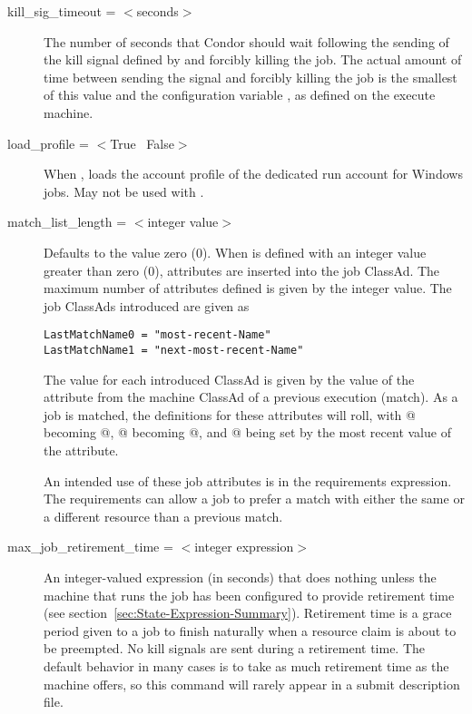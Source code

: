 \begin{description}

\item[kill\_sig\_timeout = $<$seconds$>$] The number of seconds that Condor
should wait following the sending of the kill signal defined by
 and forcibly killing the job.
The actual amount of time between sending the signal and forcibly killing
the job is the smallest of this value and the configuration variable
, as defined on the execute machine.


\item[load\_profile = $<$True \Bar\ False$>$]
When , loads the account profile of the dedicated run account for
Windows jobs.
May not be used with .


\item[match\_list\_length = $<$integer value$>$]
Defaults to the value zero (0).
When  is defined with an integer value
greater than zero (0),
attributes are inserted into the job ClassAd.
The maximum number of attributes defined is given by the integer
value.
The job ClassAds introduced are given as
\begin{verbatim}
LastMatchName0 = "most-recent-Name"
LastMatchName1 = "next-most-recent-Name"
\end{verbatim}

The value for each introduced ClassAd is given by the
value of the  attribute
from the machine ClassAd of a previous execution (match).
As a job is matched, the definitions for these attributes
will roll,
with @ becoming @,
@ becoming @,
and @ being set by the most recent
value of the  attribute.

An intended use of
these job attributes is in the requirements expression.
The requirements can allow a job to prefer a match with either the same
or a different resource than a previous match.



\item[max\_job\_retirement\_time = $<$integer expression$>$]
An integer-valued expression (in seconds) that
does nothing unless the machine that runs the job has been configured
to provide retirement time
(see section~\ref{sec:State-Expression-Summary}).
Retirement time is a
grace period given to a job to finish naturally
when a resource claim is about to be preempted.
No kill signals are sent during a retirement time.
The default behavior in many cases is to take as much
retirement time as the machine offers,
so this command will rarely appear in a submit description file.


\end{description}
